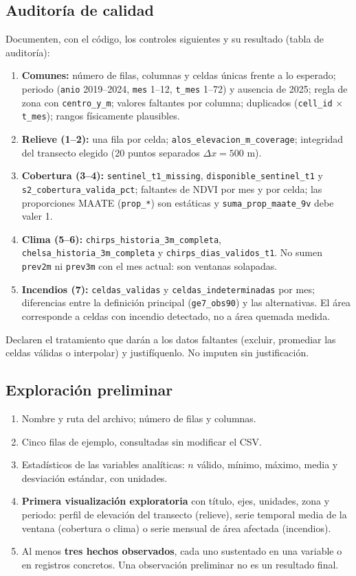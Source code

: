 \documentclass[11pt,a4paper]{article}
\begin{document}
\subsection*{Auditoría de calidad}
Documenten, con el código, los controles siguientes y su resultado (tabla de auditoría):
\begin{enumerate}
  \item \textbf{Comunes:} número de filas, columnas y celdas únicas frente a lo esperado; periodo (\texttt{anio} 2019--2024, \texttt{mes} 1--12, \texttt{t\_mes} 1--72) y ausencia de 2025; regla de zona con \texttt{centro\_y\_m}; valores faltantes por columna; duplicados (\texttt{cell\_id} $\times$ \texttt{t\_mes}); rangos físicamente plausibles.
  \item \textbf{Relieve (1--2):} una fila por celda; \texttt{alos\_elevacion\_m\_coverage}; integridad del transecto elegido (20 puntos separados $\Delta x=500$ m).
  \item \textbf{Cobertura (3--4):} \texttt{sentinel\_t1\_missing}, \texttt{disponible\_sentinel\_t1} y \texttt{s2\_cobertura\_valida\_pct}; faltantes de NDVI por mes y por celda; las proporciones MAATE (\texttt{prop\_*}) son estáticas y \texttt{suma\_prop\_maate\_9v} debe valer 1.
  \item \textbf{Clima (5--6):} \texttt{chirps\_historia\_3m\_completa}, \texttt{chelsa\_historia\_3m\_completa} y \texttt{chirps\_dias\_validos\_t1}. No sumen \texttt{prev2m} ni \texttt{prev3m} con el mes actual: son ventanas solapadas.
  \item \textbf{Incendios (7):} \texttt{celdas\_validas} y \texttt{celdas\_indeterminadas} por mes; diferencias entre la definición principal (\texttt{ge7\_obs90}) y las alternativas. El área corresponde a celdas con incendio detectado, no a área quemada medida.
\end{enumerate}
Declaren el tratamiento que darán a los datos faltantes (excluir, promediar las celdas válidas o interpolar) y justifíquenlo. No imputen sin justificación.

\subsection*{Exploración preliminar}
\begin{enumerate}
  \item Nombre y ruta del archivo; número de filas y columnas.
  \item Cinco filas de ejemplo, consultadas sin modificar el CSV.
  \item Estadísticos de las variables analíticas: $n$ válido, mínimo, máximo, media y desviación estándar, con unidades.
  \item \textbf{Primera visualización exploratoria} con título, ejes, unidades, zona y periodo: perfil de elevación del transecto (relieve), serie temporal media de la ventana (cobertura o clima) o serie mensual de área afectada (incendios).
  \item Al menos \textbf{tres hechos observados}, cada uno sustentado en una variable o en registros concretos. Una observación preliminar no es un resultado final.
\end{enumerate}
\end{document}

